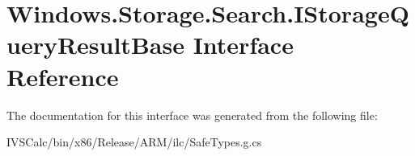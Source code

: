 \hypertarget{interface_windows_1_1_storage_1_1_search_1_1_i_storage_query_result_base}{}\section{Windows.\+Storage.\+Search.\+I\+Storage\+Query\+Result\+Base Interface Reference}
\label{interface_windows_1_1_storage_1_1_search_1_1_i_storage_query_result_base}


The documentation for this interface was generated from the following file\+:\begin{DoxyCompactItemize}
\item 
I\+V\+S\+Calc/bin/x86/\+Release/\+A\+R\+M/ilc/Safe\+Types.\+g.\+cs\end{DoxyCompactItemize}
